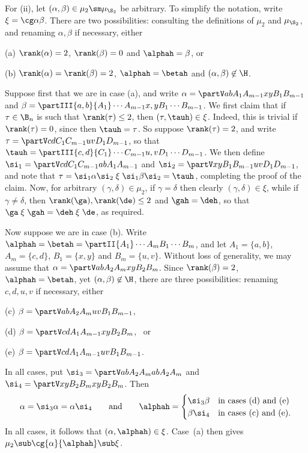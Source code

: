 For (ii), let $(\alpha,\beta)\in\mu_{2}\sm\mu_{\S_2}$  be arbitrary.
To simplify the notation, write $\xi=\cg\alpha\beta$.  There are two possibilities: consulting the definitions of $\mu_2$ and $\mu_{\S_2}$, and renaming $\alpha,\beta$ if necessary, either
\begin{itemize}\begin{multicols}{2}
\item[(a)] $\rank(\alpha)=2$, $\rank(\beta)=0$ and $\alphah=\beta$, or
\item[(b)] $\rank(\alpha)=\rank(\beta)=2$, $\alphah=\betah$ and $(\alpha,\beta)\not\in{\H}$.
\end{multicols}
\end{itemize}
Suppose first that we are in case (a), and write $\alpha=\partV ab{A_1}{A_{m-1}}xy{B_1}{B_{m-1}}$ and $\beta=\partIII{a,b}{A_1}\cdots{A_{m-1}}{x,y}{B_1}\cdots{B_{m-1}}$.  
We first claim that if $\tau\in\B_n$ is such that $\rank(\tau)\leq2$, then
$(\tau,\tauh)\in\xi$.  Indeed, this is trivial if $\rank(\tau)=0$, since then
$\tauh=\tau$.  So suppose $\rank(\tau)=2$, and write $\tau=\partV cd{C_1}{C_{m-1}}uv{D_1}{D_{m-1}}$, so that $\tauh=\partIII{c,d}{C_1}\cdots{C_{m-1}}{u,v}{D_1}\cdots{D_{m-1}}$.  We then define $\si_1=\partV cd{C_1}{C_{m-1}}ab{A_1}{A_{m-1}}$ and $\si_2=\partV xy{B_1}{B_{m-1}}uv{D_1}{D_{m-1}}$, and note that $\tau = \si_1\alpha\si_2 \mathrel\xi \si_1\beta\si_2 =\tauh$, completing the proof of the claim.  
Now, for arbitrary $(\gamma,\delta)\in\mu_2$, if $\gamma=\delta$ then clearly $(\gamma,\delta)\in\xi$, while if $\gamma\neq\delta$, then $\rank(\ga),\rank(\de)\leq2$ and $\gah=\deh$, so that $\ga \mathrel\xi \gah = \deh \mathrel\xi \de$, as required.  


Now suppose we are in case (b).  Write $\alphah=\betah=\partII{A_1}\cdots{A_m}{B_1}\cdots{B_m}$, and let $A_1=\{a,b\}$, $A_m=\{c,d\}$, $B_1=\{x,y\}$ and $B_m=\{u,v\}$.  Without loss of generality, we may assume that $\alpha=\partV ab{A_2}{A_m}xy{B_2}{B_m}$.  Since $\rank(\beta)=2$, $\alphah=\betah$, yet $(\alpha,\beta)\not\in{\H}$, there are three possibilities: renaming $c,d,u,v$ if necessary, either
\begin{itemize}\begin{multicols}{3}
\item[(c)] $\beta=\partV ab{A_2}{A_m}uv{B_1}{B_{m-1}}$, 
\item[(d)] $\beta=\partV cd{A_1}{A_{m-1}}xy{B_2}{B_m}$, \ or
\item[(e)] $\beta=\partV cd{A_1}{A_{m-1}}uv{B_1}{B_{m-1}}$.
\end{multicols}\end{itemize}
In all cases, put $\si_3=\partV ab{A_2}{A_m}ab{A_2}{A_m}$ and $\si_4=\partV xy{B_2}{B_m}xy{B_2}{B_m}$.  Then 
\[
\alpha=\si_3\alpha=\alpha\si_4
\qquad\text{and}\qquad
\alphah=\begin{cases}
\si_3\beta &\text{in cases (d) and (e)}\\
\beta\si_4 &\text{in cases (c) and (e).}
\end{cases}
\]
In all cases, it follows that $(\alpha,\alphah)\in \xi$.
Case~(a) then gives $\mu_2\sub\cg{\alpha}{\alphah}\sub\xi$.

